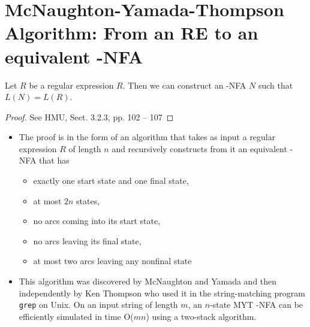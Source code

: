 \documentclass[]{article}
\begin{document}
\section{McNaughton-Yamada-Thompson Algorithm: From an RE to an equivalent
\textepsilon-NFA}
  \begin{thm}
    Let $R$ be a regular expression $R$. Then we can construct an
    \textepsilon-NFA $N$ such that $L(N) = L(R)$.
  \end{thm}
  \begin{proof}
    See HMU, Sect. 3.2.3, pp. 102 -- 107
  \end{proof}
  \begin{itemize}
    \item The proof is in the form of an algorithm that takes as input a regular
    expression $R$ of length $n$ and recursively constructs from it an
    equivalent \textepsilon-NFA that has
      \begin{itemize}
        \item exactly one start state and one final state,
        \item at most $2n$ states,
        \item no arcs coming into its start state,
        \item no arcs leaving its final state,
        \item at most two arcs leaving any nonfinal state
      \end{itemize}
    \item This algorithm was discovered by McNaughton and Yamada and then
    independently by Ken Thompson who used it in the string-matching program
    \texttt{grep} on Unix. On an input string of length $m$, an $n$-state MYT
    \textepsilon-NFA can be efficiently simulated in time O($mn$) using a
    two-stack algorithm.
  \end{itemize}
\end{document}

